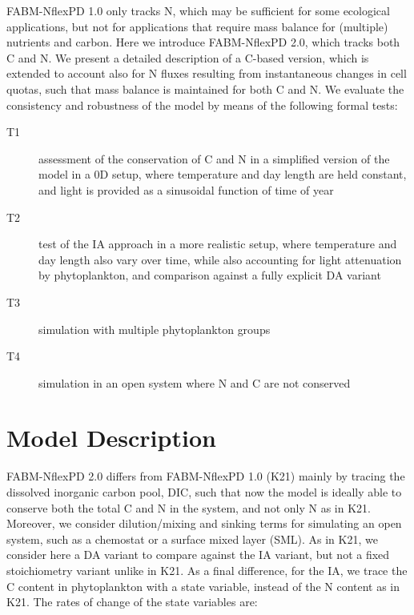 \documentclass[gmd, manuscript]{copernicus}
\begin{document}
FABM-NflexPD 1.0 only tracks N, which may be sufficient for some ecological applications, but not for applications that require mass balance for (multiple) nutrients and carbon.  Here we introduce FABM-NflexPD 2.0, which tracks both C and N\@.  We present a detailed description of a C-based version, which is extended to account also for N fluxes resulting from instantaneous changes in cell quotas, such that mass balance is maintained for both C and N\@.  We evaluate the consistency and robustness of the model by means of the following formal tests:
\begin{description}
 \item [T1] assessment of the conservation of C and N in a simplified version of the model in a 0D setup, where temperature and day length are held constant, and light is provided as a sinusoidal function of time of year
 \item [T2] test of the IA approach in a more realistic setup, where temperature and day length also vary over time, while also accounting for light attenuation by phytoplankton, and comparison against a fully explicit DA variant 
 \item [T3] simulation with multiple phytoplankton groups
 \item [T4] simulation in an open system where N and C are not conserved
\end{description}


\section{Model Description}


FABM-NflexPD 2.0 differs from FABM-NflexPD 1.0 (K21) mainly by tracing the dissolved inorganic carbon pool, DIC, such that now the model is ideally able to conserve both the total C and N in the system, and not only N as in K21. Moreover, we consider dilution/mixing and sinking terms for simulating an open system, such as a chemostat or a surface mixed layer (SML). As in K21, we consider here a DA variant to compare against the IA variant, but not a fixed stoichiometry variant unlike in K21. As a final difference, for the IA, we trace the C content in phytoplankton with a state variable, instead of the N content as in K21. The rates of change of the state variables are:
\end{document}
